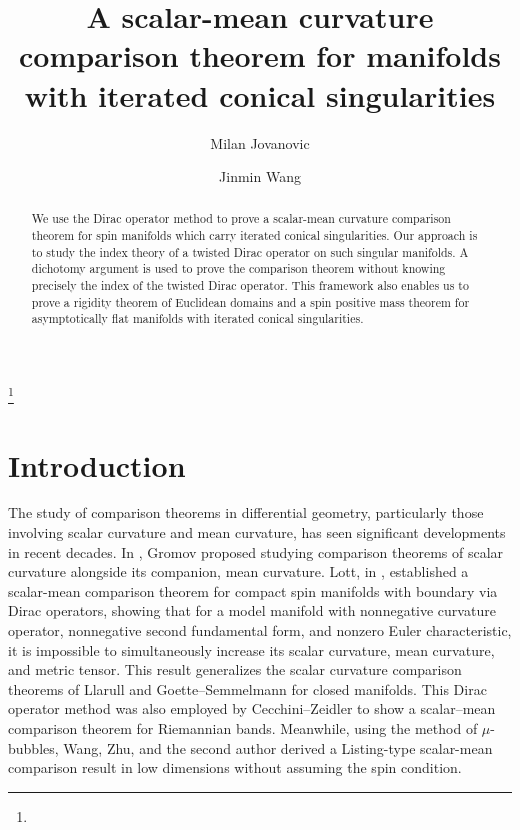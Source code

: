 \documentclass[12pt, reqno]{amsart}
\theoremstyle{plain} %
\theoremstyle{definition}
\theoremstyle{remark}
\numberwithin{equation}{section}
\begin{document}
\title[scalar-mean comparison for manifolds with conical strati]{A scalar-mean curvature comparison theorem for manifolds with iterated conical singularities}

\author{Milan Jovanovic}
\address[Milan Jovanovic]{Texas A\&M University}
\author{Jinmin Wang}
\address[Jinmin Wang]{Institute of Mathematics, Chinese Academy of Sciences}

\thanks{}

\date{}
\begin{abstract}
We use the Dirac operator method to prove a scalar-mean curvature comparison theorem for spin manifolds which carry iterated conical singularities. Our approach is to study the index theory of a twisted Dirac operator on such singular manifolds.
A dichotomy argument is used to prove the comparison theorem without knowing precisely the index of the twisted Dirac operator.
 This framework also enables us to prove a rigidity theorem of Euclidean domains and a spin positive mass theorem for asymptotically flat manifolds with iterated conical singularities.
\end{abstract}
\maketitle
\section{Introduction}
The study of comparison theorems in differential geometry, particularly those involving scalar curvature and mean curvature, has seen significant developments in recent decades.
In \cite{Gromov:2021}, Gromov proposed studying comparison theorems of scalar curvature alongside its companion, mean curvature. Lott, in \cite{Lott:2020}, established a scalar-mean comparison theorem for compact spin manifolds with boundary via Dirac operators, showing that for a model manifold with nonnegative curvature operator, nonnegative second fundamental form, and nonzero Euler characteristic, it is impossible to simultaneously increase its scalar curvature, mean curvature, and metric tensor. This result generalizes the scalar curvature comparison theorems of Llarull \cite{Llarull:1998} and Goette--Semmelmann \cite{Goette:2002} for closed manifolds. This Dirac operator method was also employed by Cecchini--Zeidler \cite{CecchiniZeidler2024} to show a scalar--mean comparison theorem for Riemannian bands. Meanwhile, using the method of \(\mu\)-bubbles, Wang, Zhu, and the second author \cite{WZ24} derived a Listing-type scalar-mean comparison result in low dimensions without assuming the spin condition.
\end{document}
